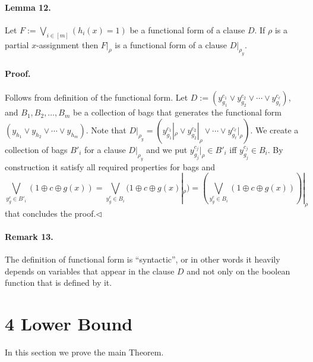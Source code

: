 \paragraph{Lemma 12.} Let $F:=\bigvee_{i\in[m]}(h_i(x)=1)$ be a functional form of a clause $D$. If $\rho$ is a partial $x$-assignment then $F|_\rho$ is a functional form of a clause $D|_{\rho_y}$.
\paragraph{Proof.} Follows from definition of the functional form. Let $D:=(y_{g_1}^{c_1}\vee y_{g_2}^{c_2}\vee\cdots\vee y_{g_\ell}^{c_\ell})$, and $B_1,B_2,\ldots,B_m$ be a collection of bags that generates the functional form $(y_{h_1}\vee y_{h_2}\vee\cdots\vee y_{h_m})$.
Note that $D|_{\rho_y}=(y_{g_1}^{c_1}|_\rho\vee y_{g_2}^{c_2}|_\rho\vee\cdots\vee y_{g_\ell}^{c_\ell}|_\rho)$. We create a collection of bags $B'_i$ for a clause $D|_{\rho_y}$ and we put $y_{g_j}^{c_j}|_\rho\in B'_i$ iff $y_{g_j}^{c_j}\in B_i$. By construction it satisfy all required properties for bags and
\[\bigvee_{y_g^c\in B'_i}(1\oplus c\oplus g(x))=\bigvee_{y_g^c\in B_i}(1\oplus c\oplus g(x)|_\rho)=\left(\bigvee_{y_g^c\in B_i}(1\oplus c\oplus g(x))\right)|_\rho\]
that concludes the proof.\hfill$\triangleleft$
\paragraph{Remark 13.} The definition of functional form is ``syntactic'', or in other words it heavily depends on variables that appear in the clause $D$ and not only on the boolean function that is defined by it.
\section*{4 Lower Bound}
In this section we prove the main Theorem.
